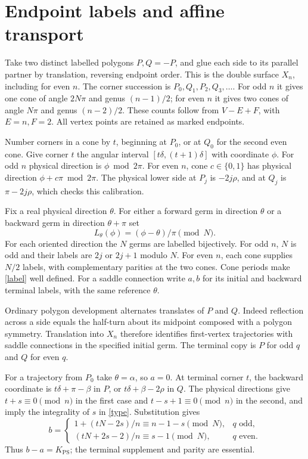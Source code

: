 \documentclass[11pt]{article}
\newcommand{\K}{K_{\mathrm{PS}}}
\begin{document}
\section{Endpoint labels and affine transport}
Take two distinct labelled polygons $P,Q=-P$, and glue each side to its
parallel partner by translation, reversing endpoint order.
This is the double surface $X_n$, including for even $n$.
The corner succession is $P_0,Q_1,P_2,Q_3,\ldots$.
For odd $n$ it gives one cone of angle $2N\pi$ and genus $(n-1)/2$;
for even $n$ it gives two cones of angle $N\pi$ and genus $(n-2)/2$.
These counts follow from $V-E+F$, with $E=n,F=2$.
All vertex points are retained as marked endpoints.

Number corners in a cone by $t$, beginning at $P_0$, or at $Q_0$ for
the second even cone. Give corner $t$ the angular interval
$[t\delta,(t+1)\delta]$ with coordinate $\phi$.
For odd $n$ physical direction is $\phi\bmod2\pi$.
For even $n$, cone $c\in\{0,1\}$ has physical direction
$\phi+c\pi\bmod2\pi$.
The physical lower side at $P_j$ is $-2j\rho$, and at $Q_j$ is
$\pi-2j\rho$, which checks this calibration.

Fix a real physical direction $\theta$. For either a forward germ
in direction $\theta$ or a backward germ in direction $\theta+\pi$ set
\begin{equation}\label{label}
L_\theta(\phi)=(\phi-\theta)/\pi\pmod N .
\end{equation}
For each oriented direction the $N$ germs are labelled bijectively.
For odd $n$, $N$ is odd and their labels are $2j$ or $2j+1$ modulo $N$.
For even $n$, each cone supplies $N/2$ labels, with complementary
parities at the two cones. Cone periods make \eqref{label} well defined.
For a saddle connection write $a,b$ for its initial and backward
terminal labels, with the same reference $\theta$.

Ordinary polygon development alternates translates of $P$ and $Q$.
Indeed reflection across a side equals the half-turn about its midpoint
composed with a polygon symmetry. Translation into $X_n$ therefore
identifies first-vertex trajectories with saddle connections in the
specified initial germ. The terminal copy is $P$ for odd $q$ and $Q$
for even $q$.

For a trajectory from $P_0$ take $\theta=\alpha$, so $a=0$.
At terminal corner $t$, the backward coordinate is
$t\delta+\pi-\beta$ in $P$, or $t\delta+\beta-2\rho$ in $Q$.
The physical directions give $t+s\equiv0\pmod n$ in the first case
and $t-s+1\equiv0\pmod n$ in the second, and imply the integrality of
$s$ in \eqref{type}. Substitution gives
\[
b=\begin{cases}
1+(tN-2s)/n\equiv n-1-s\pmod N,&q\text{ odd},\\
(tN+2s-2)/n\equiv s-1\pmod N,&q\text{ even}.
\end{cases}
\]
Thus $b-a=\K$; the terminal supplement and parity are essential.
\end{document}
